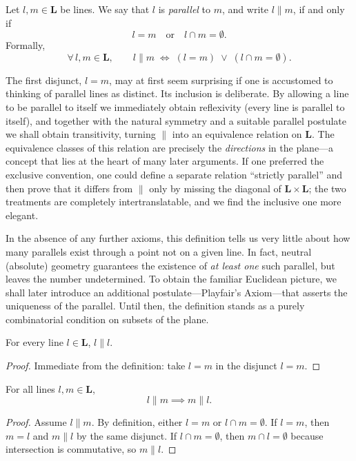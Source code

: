 \documentclass[../../../main/main.tex]{subfiles}
\begin{document}
\begin{definition}
  Let \(l,m\in\mathbf{L}\) be lines.  We say that \(l\) is \textit{parallel} to \(m\), and write \(l \parallel m\), if and only if
  \[
  l = m \quad\text{or}\quad l \cap m = \emptyset.
  \]
  Formally,
  \[
  \forall\, l,m\in\mathbf{L},\qquad
  l \parallel m \;\iff\; (l = m) \;\lor\; (l \cap m = \emptyset).
  \]
\end{definition}

The first disjunct, \(l = m\), may at first seem surprising if one is accustomed to thinking of parallel lines as distinct.  Its inclusion is deliberate.  By allowing a line to be parallel to itself we immediately obtain reflexivity (every line is parallel to itself), and together with the natural symmetry and a suitable parallel postulate we shall obtain transitivity, turning \(\parallel\) into an equivalence relation on \(\mathbf{L}\).  The equivalence classes of this relation are precisely the \textit{directions} in the plane—a concept that lies at the heart of many later arguments.  If one preferred the exclusive convention, one could define a separate relation “strictly parallel” and then prove that it differs from \(\parallel\) only by missing the diagonal of \(\mathbf{L}\times\mathbf{L}\); the two treatments are completely intertranslatable, and we find the inclusive one more elegant.

In the absence of any further axioms, this definition tells us very little about how many parallels exist through a point not on a given line.  In fact, neutral (absolute) geometry guarantees the existence of \textit{at least one} such parallel, but leaves the number undetermined.  To obtain the familiar Euclidean picture, we shall later introduce an additional postulate—Playfair’s Axiom—that asserts the uniqueness of the parallel.  Until then, the definition stands as a purely combinatorial condition on subsets of the plane.

\begin{theorem}\label{thm:par-refl}
    For every line $l\in\mathbf{L}$, $l \parallel l$.
\end{theorem}
\begin{proof}
    Immediate from the definition: take $l=m$ in the disjunct $l=m$.
\end{proof}

\begin{theorem}\label{thm:par-sym}
    For all lines $l,m\in\mathbf{L}$,
    \[
    l \parallel m \implies m \parallel l.
    \]
\end{theorem}
\begin{proof}
    Assume $l \parallel m$.  By definition, either $l=m$ or $l\cap m=\emptyset$. If $l=m$, then $m=l$ and $m\parallel l$ by the same disjunct. If $l\cap m=\emptyset$, then $m\cap l=\emptyset$ because intersection is commutative, so $m\parallel l$.
\end{proof}
\end{document}
